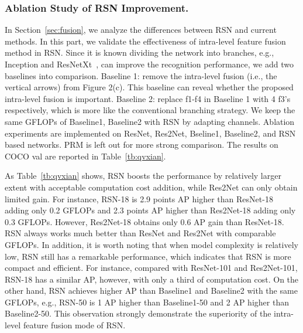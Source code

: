 \documentclass[runningheads]{llncs}
\begin{document}
\subsubsection{Ablation Study of RSN Improvement.}\label{sec: ablation-rsn}
In Section~\ref{sec:fusion}, we analyze the differences between RSN and current methods. In this part, we validate the effectiveness of intra-level feature fusion method in RSN. Since it is known dividing the network into branches, e.g., Inception and ResNetXt~\cite{resnext}, can improve the recognition performance,  we add two baselines into comparison. Baseline 1: remove the intra-level fusion (i.e., the vertical arrows) from Figure 2(c).  This baseline can reveal whether the proposed intra-level fusion is important. Baseline 2: replace f1-f4 in Baseline 1 with  4 f3's respectively, which is more like the conventional branching strategy. We keep the same GFLOPs of Baseline1, Baseline2 with RSN by adapting channels. Ablation experiments are implemented on ResNet, Res2Net, Bseline1, Baseline2, and RSN based networks. PRM is left out for more strong comparison.  The results on COCO val are reported in Table~\ref{tb:qvxian}. 

As Table~\ref{tb:qvxian} shows, RSN boosts the performance by relatively larger extent with acceptable computation cost addition, while Res2Net can only obtain limited gain. For instance, RSN-18 is 2.9 points AP higher than ResNet-18 adding only 0.2 GFLOPs and 2.3 points AP higher than Res2Net-18 adding only 0.3 GFLOPs. However, Res2Net-18 obtains only 0.6 AP gain than ResNet-18. 
RSN always works much better than ResNet and Res2Net with comparable GFLOPs. In addition, it is worth noting that when model complexity is relatively low, RSN still has a remarkable performance, which indicates that RSN is more compact and efficient. For instance, compared with ResNet-101 and Res2Net-101, RSN-18 has a similar AP, however, with only a third of computation cost. On the other hand, RSN achieves higher AP than Baseline1 and Baseline2 with the same GFLOPs, e.g., RSN-50 is 1 AP higher than Baseline1-50 and 2 AP higher than Baseline2-50. This observation strongly demonstrate the superiority of the intra-level feature fusion mode of RSN. 



\iffalse
\begin{figure}[h]

 \centering
\texttt{[image: pic/qvxian\_1.png]} \caption{Illustrating how the performances of RSN and ResNet are affected by GFLOPs} \label{fig:qvxian} \end{figure}
\fi
\end{document}
